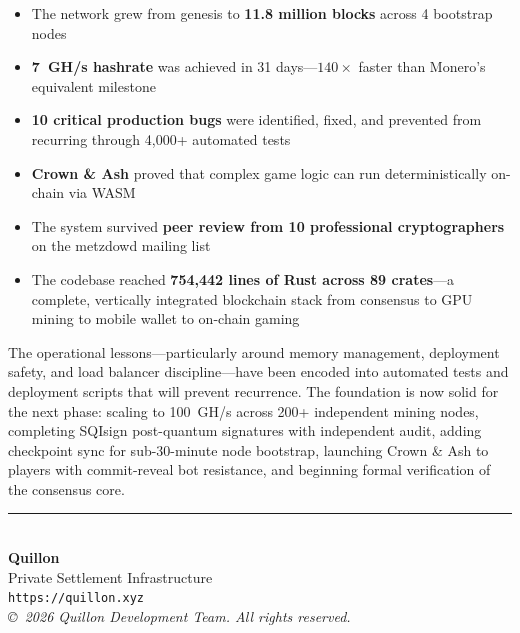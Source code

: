 \documentclass[11pt,a4paper]{article}
\begin{document}
\begin{itemize}[leftmargin=*]
    \item The network grew from genesis to \textbf{11.8 million blocks} across 4 bootstrap nodes
    \item \textbf{7~GH/s hashrate} was achieved in 31 days---$140\times$ faster than Monero's equivalent milestone
    \item \textbf{10 critical production bugs} were identified, fixed, and prevented from recurring through 4,000+ automated tests
    \item \textbf{Crown \& Ash} proved that complex game logic can run deterministically on-chain via WASM
    \item The system survived \textbf{peer review from 10 professional cryptographers} on the metzdowd mailing list
    \item The codebase reached \textbf{754,442 lines of Rust across 89 crates}---a complete, vertically integrated blockchain stack from consensus to GPU mining to mobile wallet to on-chain gaming
\end{itemize}

The operational lessons---particularly around memory management, deployment safety, and load balancer discipline---have been encoded into automated tests and deployment scripts that will prevent recurrence. The foundation is now solid for the next phase: scaling to 100~GH/s across 200+ independent mining nodes, completing SQIsign post-quantum signatures with independent audit, adding checkpoint sync for sub-30-minute node bootstrap, launching Crown \& Ash to players with commit-reveal bot resistance, and beginning formal verification of the consensus core.

\vspace{1cm}
\begin{center}
\textcolor{qgold}{\rule{0.4\textwidth}{1pt}}\\[0.5cm]
{\Large\bfseries\textcolor{qblue}{Quillon}}\\[0.2cm]
{\small Private Settlement Infrastructure}\\[0.2cm]
\texttt{https://quillon.xyz}\\[0.2cm]
\textit{\copyright\ 2026 Quillon Development Team. All rights reserved.}
\end{center}
\end{document}
